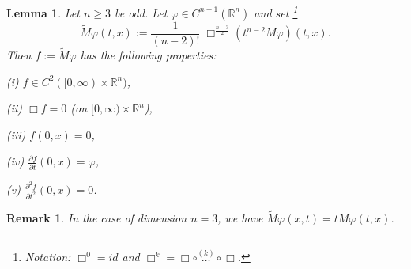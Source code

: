 \documentclass[12pt, oneside, a4paper]{article}
\newtheorem{lem}[thm]{Lemma}
\def\Mtil{\widetilde{M}}
\theoremstyle{dfn}
\newtheorem{rem}[thm]{Remark}
\def\Rbb{\ensuremath{\mathbb{R}}}
\begin{document}
\begin{lem}
Let $n \geqslant 3$ be odd. Let $\varphi \in C^{n-1}(\Rbb^n)$ and set%
\footnote{Notation: $\Box^0 = id$ and $\Box^k = \Box \circ \overset{(k)}{{}\dots{}} \circ \Box$.}
\[
\Mtil \varphi (t,x)
:= \frac{1}{(n-2)!} \; \Box^{\frac{n-3}{2}} (t^{n-2} M\varphi) (t,x).
\]
Then $f := \Mtil \varphi$ has the following properties:
	
	(i) $f \in C^2([0,\infty) \times \Rbb^n)$, 
	
	(ii) $\Box f = 0$ (on $[0,\infty) \times \Rbb^n$),
	
	(iii) $f(0,x) = 0$,
	
	(iv) $\frac{\partial f}{\partial t} (0,x) = \varphi$,
	
	(v) $\frac{\partial^2 f}{\partial t^2} (0,x) = 0$.
\end{lem}

\begin{rem}
In the case of dimension $n = 3$, we have $\Mtil\varphi(x,t) = t M\varphi(t,x)$.
\end{rem}
\end{document}
